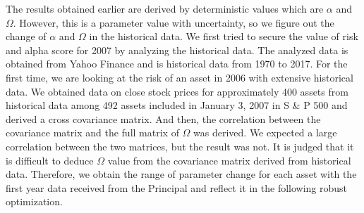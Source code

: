 \documentclass[11pt]{article}
\begin{document}
	The results obtained earlier are derived by deterministic values which are $\alpha$ and $\Omega$. However, this is a parameter value with uncertainty, so we figure out the change of $\alpha$ and $\Omega$ in the historical data.  We first tried to secure the value of risk and alpha score for 2007 by analyzing the historical data. The analyzed data is obtained from Yahoo Finance and is historical data from 1970 to 2017. For the first time, we are looking at the risk of an asset in 2006 with extensive historical data. We obtained data on close stock prices for approximately 400 assets from historical data among 492 assets included in January 3, 2007 in S \& P 500 and derived a cross covariance matrix. And then, the correlation between the covariance matrix and the full matrix of $\Omega$ was derived. We expected a large correlation between the two matrices, but the result was not. It is judged that it is difficult to deduce $\Omega$ value from the covariance matrix derived from historical data. Therefore, we obtain the range of parameter change for each asset with the first year data received from the Principal and reflect it in the following robust optimization. %
	
\end{document}
